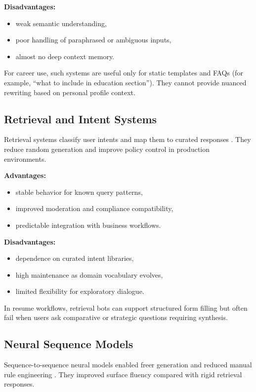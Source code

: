 \documentclass[conference]{IEEEtran}
\begin{document}
\textbf{Disadvantages:}
\begin{itemize}
    \item weak semantic understanding,
    \item poor handling of paraphrased or ambiguous inputs,
    \item almost no deep context memory.
\end{itemize}

For career use, such systems are useful only for static templates and FAQs (for example, ``what to include in education section''). They cannot provide nuanced rewriting based on personal profile context.

\subsection{Retrieval and Intent Systems}
Retrieval systems classify user intents and map them to curated responses \cite{shawar2007}. They reduce random generation and improve policy control in production environments.

\textbf{Advantages:}
\begin{itemize}
    \item stable behavior for known query patterns,
    \item improved moderation and compliance compatibility,
    \item predictable integration with business workflows.
\end{itemize}

\textbf{Disadvantages:}
\begin{itemize}
    \item dependence on curated intent libraries,
    \item high maintenance as domain vocabulary evolves,
    \item limited flexibility for exploratory dialogue.
\end{itemize}

In resume workflows, retrieval bots can support structured form filling but often fail when users ask comparative or strategic questions requiring synthesis.

\subsection{Neural Sequence Models}
Sequence-to-sequence neural models enabled freer generation and reduced manual rule engineering \cite{sutskever2014}. They improved surface fluency compared with rigid retrieval responses.
\end{document}
